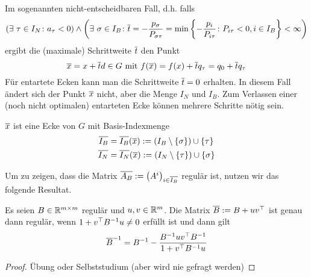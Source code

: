 Im sogenannten nicht-entscheidbaren Fall, d.h. falls
\begin{equation*}
	\left( \exists \ \tau \in I_N \colon a_\tau < 0 \right) \land \left(  \exists \ \sigma \in I_B \colon \overline{t} = -\frac{p_\sigma}{P_{\sigma \tau}} = \min \left\{ -\frac{p_i}{P_{i \tau}} \colon P_{i \tau} < 0, i \in I_B \right\} < \infty \right)
\end{equation*}
ergibt die (maximale) Schrittweite $\overline{t}$ den Punkt
\begin{equation*}
	\overline{x} = x + \overline{t} d \in G \text{ mit } f(\overline{x}) = f(x) + \overline{t} q_\tau = q_0 + \overline{t} q_\tau
\end{equation*}
Für entartete Ecken kann man die Schrittweite $\overline{t} = 0$ erhalten. In diesem Fall ändert sich der Punkt $\overline{x}$ nicht, aber die Menge $I_N$ und $I_B$. Zum Verlassen einer (noch nicht optimalen) entarteten Ecke können mehrere Schritte nötig sein. 

\begin{satz} %
	\label{satz: 3.6}
	$\overline{x}$ ist eine Ecke von $G$ mit Basis-Indexmenge
	\begin{equation*}
		\begin{aligned}
			\overline{I_B} &= \overline{I_B}(\overline{x}) \mathrel{:=} \left( I_B \setminus \left\{ \sigma \right\} \right) \cup \left\{ \tau \right\} \\
			\overline{I_N} &= \overline{I_N}(\overline{x}) \mathrel{:=} \left( I_N \setminus \left\{ \tau \right\} \right) \cup \left\{ \sigma \right\}
		\end{aligned}
	\end{equation*}
\end{satz}

Um zu zeigen, dass die Matrix $\overline{A_B} \mathrel{:=} \left( A^i \right)_{i \in \overline{I_B}}$ regulär ist, nutzen wir das folgende Resultat.

\begin{lemma} %
	\label{lemma: 3.7}
	Es seien $B \in \mathbb{R}^{m \times m}$ regulär und $u,v \in \mathbb{R}^m$. Die Matrix $\overline{B} \mathrel{:=} B + u v^{\top}$ ist genau dann regulär, wenn $1 + v^{\top} B^{-1} u \neq 0$ erfüllt ist und dann gilt
	\begin{equation*}
		\overline{B}^{-1} = B^{-1} - \frac{B^{-1} u v^{\top} B^{-1}}{1 + v^{\top} B^{-1} u}
	\end{equation*}
\end{lemma}
\begin{proof}
	Übung oder Selbststudium (aber wird nie gefragt werden)
\end{proof}


